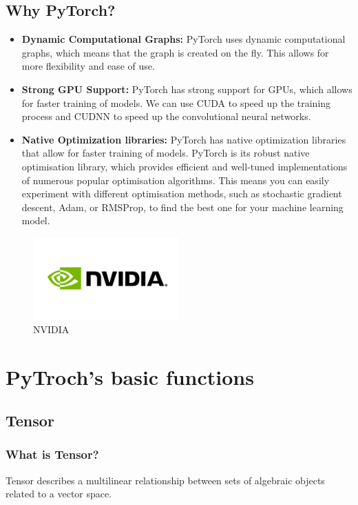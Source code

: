 \documentclass[12pt,hyperref,a4paper,UTF8]{article}
\begin{document}
\subsection{Why PyTorch?}
\begin{itemize}
    \item \textbf{Dynamic Computational Graphs:} PyTorch uses dynamic computational graphs, which means that the graph is created on the fly. This allows for more flexibility and ease of use.
    \item \textbf{Strong GPU Support:} PyTorch has strong support for GPUs, which allows for faster training of models. We can use CUDA to speed up the training process and CUDNN to speed up the convolutional neural networks.
    \item \textbf{Native Optimization libraries:} PyTorch has native optimization libraries that allow for faster training of models. PyTorch is its robust native optimisation library, which provides efficient and well-tuned implementations of numerous popular optimisation algorithms. This means you can easily experiment with different optimisation methods, such as stochastic gradient descent, Adam, or RMSProp, to find the best one for your machine learning model.
\end{itemize}
\begin{figure}[h]
    \centering
    \includegraphics[width=0.5\textwidth]{figures/nvidia-logo.png}
    \caption{NVIDIA}
\end{figure}


\section{PyTroch's basic functions}

\subsection{Tensor}

\subsubsection{What is Tensor?}
\textbf{} Tensor describes a multilinear relationship between sets of algebraic objects related to a vector space.
\end{document}
